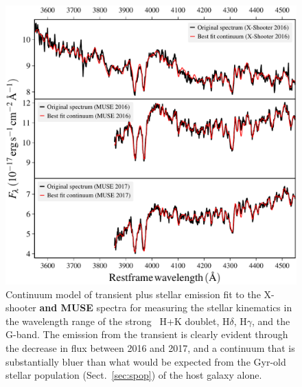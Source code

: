 \documentclass[traditabstract]{aa}
\newcommand{\hg}{H$\gamma$}
\newcommand{\hd}{H$\delta$}
\begin{document}
\begin{figure}
  \includegraphics[width=0.999\linewidth]{fig/Stargas_spec_sigma.pdf}
\caption{Continuum model of transient plus stellar emission fit to the X-shooter \textbf{and MUSE} spectra for measuring the stellar kinematics in the wavelength range of the strong ~H+K doublet, \hd, \hg, and the G-band. The emission from the transient is clearly evident through the decrease in flux between 2016 and 2017, and a continuum that is substantially bluer than what would be expected from the Gyr-old stellar population (Sect.~\ref{sec:spop}) of the host galaxy alone.}
\label{fig:stargas_sig}
\end{figure}
\end{document}
